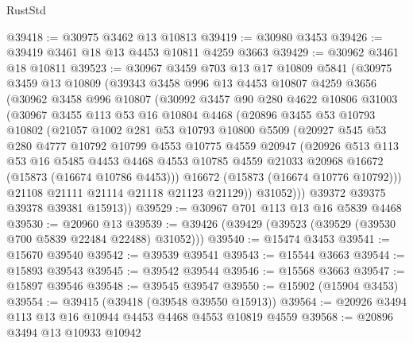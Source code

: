 \begin{lexlean}{RustStd}
\begin{coremodule}
@39418 := @30975 @3462 @13 @10813
@39419 := @30980 @3453
@39426 := @39419 @3461 @18 @13 @4453 @10811 @4259 @3663
@39429 := @30962 @3461 @18 @10811
@39523 := @30967
    @3459
    @703
    @13
    @17
    @10809
    @5841
    (@30975
      @3459
      @13
      @10809
      (@39343
        @3458
        @996
        @13
        @4453
        @10807
        @4259
        @3656
        (@30962
          @3458
          @996
          @10807
          (@30992
            @3457
            @90
            @280
            @4622
            @10806
            @31003
            (@30967
              @3455
              @113
              @53
              @16
              @10804
              @4468
              (@20896
                @3455
                @53
                @10793
                @10802
                (@21057
                  @1002
                  @281
                  @53
                  @10793
                  @10800
                  @5509
                  (@20927
                    @545
                    @53
                    @280
                    @4777
                    @10792
                    @10799
                    @4553
                    @10775
                    @4559
                    @20947
                    (@20926
                      @513
                      @113
                      @53
                      @16
                      @5485
                      @4453
                      @4468
                      @4553
                      @10785
                      @4559
                      @21033
                      @20968
                      @16672
                      (@15873 (@16674 @10786 @4453)))
                    @16672
                    (@15873 (@16674 @10776 @10792)))
                  @21108
                  @21111
                  @21114
                  @21118
                  @21123
                  @21129))
              @31052)))
        @39372
        @39375
        @39378
        @39381
        @15913))
@39529 := @30967 @701 @113 @13 @16 @5839 @4468
@39530 := @20960 @13
@39539 := @39426 (@39429 (@39523 (@39529 (@39530 @700 @5839 @22484 @22488) @31052)))
@39540 := @15474 @3453
@39541 := @15670 @39540
@39542 := @39539 @39541
@39543 := @15544 @3663
@39544 := @15893 @39543
@39545 := @39542 @39544
@39546 := @15568 @3663
@39547 := @15897 @39546
@39548 := @39545 @39547
@39550 := @15902 (@15904 @3453)
@39554 := @39415 (@39418 (@39548 @39550 @15913))
@39564 := @20926 @3494 @113 @13 @16 @10944 @4453 @4468 @4553 @10819 @4559
@39568 := @20896 @3494 @13 @10933 @10942

\end{coremodule}
\end{lexlean}

